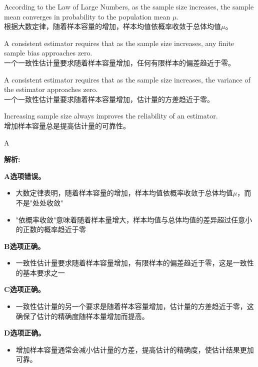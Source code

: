 \documentclass{article}
\newenvironment{explanation}
{\textbf{解析:}\par}
{\par}
\begin{document}
\begin{choices}
    \item According to the Law of Large Numbers, as the sample size increases, the sample mean converges in probability to the population mean \(\mu\).\\
    根据大数定律，随着样本容量的增加，样本均值依概率收敛于总体均值\(\mu\)。
    \item A consistent estimator requires that as the sample size increases, any finite sample bias approaches zero.\\
    一个一致性估计量要求随着样本容量增加，任何有限样本的偏差趋近于零。
    \item A consistent estimator requires that as the sample size increases, the variance of the estimator approaches zero.\\
    一个一致性估计量要求随着样本容量增加，估计量的方差趋近于零。
    \item Increasing sample size always improves the reliability of an estimator.\\
    增加样本容量总是提高估计量的可靠性。
\end{choices}

\begin{correctanswer}
    A
\end{correctanswer}

\begin{explanation}
\textbf{A选项错误。}
\begin{itemize}
    \item 大数定律表明，随着样本容量的增加，样本均值依概率收敛于总体均值\(\mu\)，而不是"处处收敛"
    \item "依概率收敛"意味着随着样本量增大，样本均值与总体均值的差异超过任意小的正数的概率趋近于零
\end{itemize}

\textbf{B选项正确。}
\begin{itemize}
    \item 一致性估计量要求随着样本容量增加，有限样本的偏差趋近于零，这是一致性的基本要求之一
\end{itemize}

\textbf{C选项正确。}
\begin{itemize}
    \item 一致性估计量的另一个要求是随着样本容量增加，估计量的方差趋近于零，这确保了估计的精确度随样本量增加而提高。
\end{itemize}

\textbf{D选项正确。}
\begin{itemize}
    \item 增加样本容量通常会减小估计量的方差，提高估计的精确度，使估计结果更加可靠。
\end{itemize}
\end{explanation}
\end{document}
